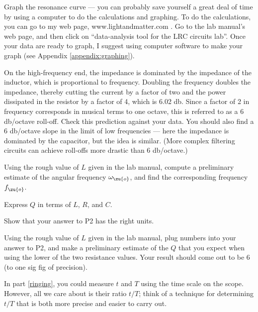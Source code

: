 Graph the resonance curve  --- you can probably save
yourself a great deal of time by using a computer to do the
calculations and graphing. To do the calculations, you
can go to my web page, www.lightandmatter.com \quad .
Go to the lab manual's web page, and then click on ``data-analysis tool for the LRC
circuits lab''. Once your data are ready to graph, I suggest
using computer software to make
your graph (see Appendix \ref{appendix:graphing}). 

On the high-frequency end, the impedance is dominated by the
impedance of the inductor, which is proportional to
frequency. Doubling the frequency doubles the impedance,
thereby cutting the current by a factor of two and the power
dissipated in the resistor by a factor of 4, which is 6.02
db. Since a factor of 2 in frequency corresponds in musical
terms to one octave, this is referred to as a 6 db/octave
roll-off. Check this prediction against your data. You
should also find a 6 db/octave slope in the limit of low
frequencies --- here the impedance is dominated by the
capacitor, but the idea is similar. (More complex filtering
circuits can achieve roll-offs more drastic than 6 db/octave.)  

\prelab

\prelabquestion Using the rough value of $L$ given in the lab manual, compute
a preliminary estimate of the angular frequency $\omega_\zu{o}$, and find the corresponding
frequency $f_\zu{o}$.

\prelabquestion Express $Q$ in terms of $L$, $R$, and $C$. 

\prelabquestion Show that your answer to P2 has the right units.

\prelabquestion Using the
rough value of $L$ given in the lab manual, plug numbers into your answer to P2,
and make a preliminary estimate of the $Q$ that you expect when using the lower
of the two resistance values. Your result should come out to be 6 (to one sig fig
of precision).

\prelabquestion In part \ref{ringing}, you could measure $t$ and $T$
using the time scale on the scope. However, all we care about is their ratio $t/T$;
think of a technique for determining $t/T$ that is both more precise and easier
to carry out.
